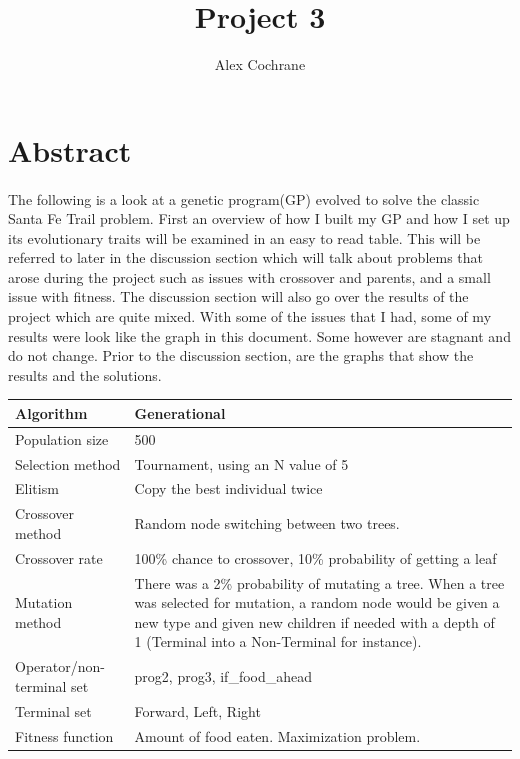 \documentclass[11pt]{article} %
\title{Project 3}
\author{Alex Cochrane}
\begin{document}
\maketitle

\section{Abstract}

\paragraph{} The following is a look at a genetic program(GP) evolved to solve the classic Santa Fe Trail problem. First an overview of how I built my GP and how I set up its evolutionary traits will be examined in an easy to read table. This will be referred to later in the discussion section which will talk about problems that arose during the project such as issues with crossover and parents, and a small issue with fitness. The discussion section will also go over the results of the project which are quite mixed. With some of the issues that I had, some of my results were look like the graph in this document. Some however are stagnant and do not change. Prior to the discussion section, are the graphs that show the results and the solutions.
\newline

\begin{tabular}{|l|p{4in}|}
\hline
Algorithm & Generational\\
\hline
Population size & 500\\
\hline
Selection method & Tournament, using an N value of 5\\
\hline
Elitism & Copy the best individual twice\\
\hline
Crossover method & Random node switching between two trees.\\
\hline
Crossover rate & 100\% chance to crossover, 10\% probability of getting a leaf\\
\hline
Mutation method & There was a 2\% probability of mutating a tree. When a tree was selected for mutation, a random node would be given a new type and given new children if needed with a depth of 1 (Terminal into a Non-Terminal for instance).\\
\hline
Operator/non-terminal set & prog2, prog3, if\_food\_ahead\\
\hline
Terminal set & Forward, Left, Right\\
\hline
Fitness function & Amount of food eaten. Maximization problem.\\
\hline
\end{tabular}
\end{document}
